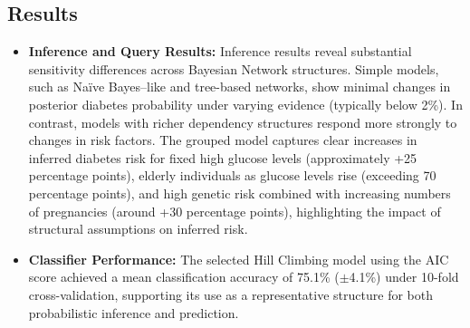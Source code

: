 \documentclass[letterpaper]{article}
\begin{document}
\subsection{Results}
\begin{itemize}
    \item \textbf{Inference and Query Results:}  
    Inference results reveal substantial sensitivity differences across Bayesian Network structures. Simple models, such as Na\"ive Bayes--like and tree-based networks, show minimal changes in posterior diabetes probability under varying evidence (typically below 2\%). In contrast, models with richer dependency structures respond more strongly to changes in risk factors. The grouped model captures clear increases in inferred diabetes risk for fixed high glucose levels (approximately +25 percentage points), elderly individuals as glucose levels rise (exceeding 70 percentage points), and high genetic risk combined with increasing numbers of pregnancies (around +30 percentage points), highlighting the impact of structural assumptions on inferred risk.

    \item \textbf{Classifier Performance:}  
    The selected Hill Climbing model using the AIC score achieved a mean classification accuracy of 75.1\% ($\pm$4.1\%) under 10-fold cross-validation, supporting its use as a representative structure for both probabilistic inference and prediction.
\end{itemize}
\end{document}
